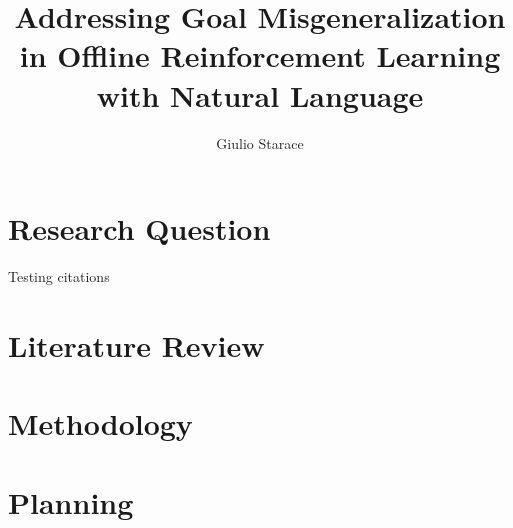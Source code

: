 \documentclass[12pt]{article}
\title{Addressing Goal Misgeneralization in Offline Reinforcement Learning with Natural Language}
\begin{document}
\author{Giulio Starace}
\maketitle
\section{Research Question}
Testing citations~\citet{abbeel_apprenticeship_2004}
\section{Literature Review}

\section{Methodology}
\section{Planning}



\end{document}
